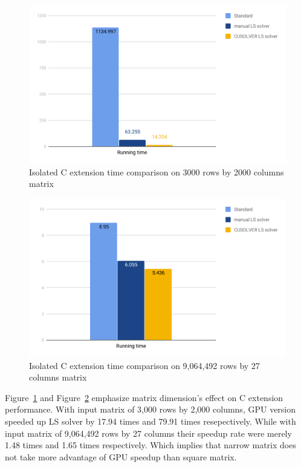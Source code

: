\documentclass[English]{dicomopapers}
\begin{document}
\begin{figure}[ht]
  \centering
  \includegraphics[width=\textwidth/3,natwidth=1200,natheight=742]{c_square.png}
  \caption{Isolated C extension time comparison on 3000 rows by 2000 columns matrix}\label{fig:c_square}
\end{figure}

\begin{figure}[ht]
  \centering
  \includegraphics[width=\textwidth/3,natwidth=1200,natheight=742]{c_narrow.png}
  \caption{Isolated C extension time comparison on 9,064,492 rows by 27 columns matrix}\label{fig:c_narrow}
\end{figure}
Figure~\ref{fig:c_square} and Figure~\ref{fig:c_narrow} emphasize matrix dimension's effect on C extension performance. With input matrix of 3,000 rows by 2,000 columns, GPU version speeded up LS solver by 17.94 times and 79.91 times resepectively. While with input matrix of 9,064,492 rows by 27 columns their speedup rate were merely 1.48 times and 1.65 times respectively. Which implies that narrow matrix does not take more advantage of GPU speedup than square matrix.
\end{document}
